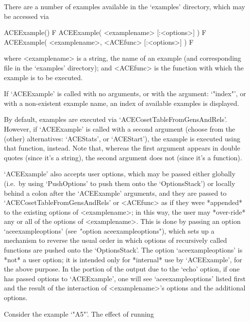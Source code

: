 
\beginitems

There are a number of examples available in the `examples'  directory,
which may be accessed via

\>ACEExample() F
\>ACEExample( <examplename> [:<options>] ) F
\>ACEExample( <examplename>, <ACEfunc> [:<options>] ) F

where  <examplename>  is  a  string,  the  name  of  an  example  (and
corresponding file in the `examples' directory); and <ACEfunc> is  the
{\ACE} function with which the example is to be executed. 

If `ACEExample' is called with no arguments,  or  with  the  argument:
`"index"', or with a non-existent example name, an index of  available
examples is displayed.

By default, examples are executed via  `ACECosetTableFromGensAndRels'.
However, if `ACEExample' is called with a second argument (choose from
the (other) alternatives: `ACEStats', or `ACEStart'), the  example  is
executed using that function, instead. Note that,  whereas  the  first
argument appears in double quotes (since it's a  string),  the  second
argument does not (since it's a function).

`ACEExample' also accepts user options, which  may  be  passed  either
globally  (i.e.~by  using  `PushOptions'  to  push   them   onto   the
`OptionsStack') or locally  behind  a  colon  after  the  `ACEExample'
arguments, and they are passed  to  `ACECosetTableFromGensAndRels'  or
<ACEfunc> as if they  were  *appended*  to  the  existing  options  of
<examplename>; in this way, the user may *over-ride* any or all of the
options  of  <examplename>.  This  is  done  by  passing   an   option
`aceexampleoptions' (see~"option aceexampleoptions"), which sets up  a
mechanism to reverse the usual order in which options  of  recursively
called functions  are  pushed  onto  the  `OptionsStack'.  The  option
`aceexampleoptions' is *not* a user option; it is  intended  only  for
*internal* use by `ACEExample', for the above purpose. In the  portion
of the output due to the `echo' option, if one has passed  options  to
`ACEExample', one will see `aceexampleoptions' listed  first  and  the
result  of  the  interaction  of  <examplename>'s  options   and   the
additional options.

Consider the example `"A5"'. The effect of running

